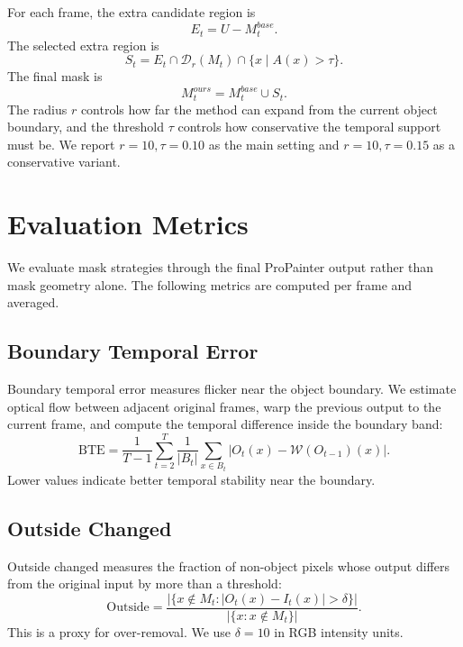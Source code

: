 \documentclass[nouppercase]{kaia}
\begin{document}
For each frame, the extra candidate region is
\begin{equation}
    E_t = U - M_t^{base}.
\end{equation}
The selected extra region is
\begin{equation}
    S_t = E_t \cap \mathcal{D}_r(M_t) \cap \{x \mid A(x) > \tau\}.
\end{equation}
The final mask is
\begin{equation}
    M_t^{ours} = M_t^{base} \cup S_t.
\end{equation}
The radius $r$ controls how far the method can expand from the current object boundary, and the threshold $\tau$ controls how conservative the temporal support must be. We report $r=10,\tau=0.10$ as the main setting and $r=10,\tau=0.15$ as a conservative variant.

\section{Evaluation Metrics}
We evaluate mask strategies through the final ProPainter output rather than mask geometry alone. The following metrics are computed per frame and averaged.

\subsection{Boundary Temporal Error}
Boundary temporal error measures flicker near the object boundary. We estimate optical flow between adjacent original frames, warp the previous output to the current frame, and compute the temporal difference inside the boundary band:
\begin{equation}
    \text{BTE} =
    \frac{1}{T-1}\sum_{t=2}^{T}\frac{1}{|B_t|}
    \sum_{x \in B_t} \left|O_t(x)-\mathcal{W}(O_{t-1})(x)\right|.
\end{equation}
Lower values indicate better temporal stability near the boundary.

\subsection{Outside Changed}
Outside changed measures the fraction of non-object pixels whose output differs from the original input by more than a threshold:
\begin{equation}
    \text{Outside} =
    \frac{|\{x \notin M_t : |O_t(x)-I_t(x)| > \delta\}|}{|\{x : x \notin M_t\}|}.
\end{equation}
This is a proxy for over-removal. We use $\delta=10$ in RGB intensity units.
\end{document}
